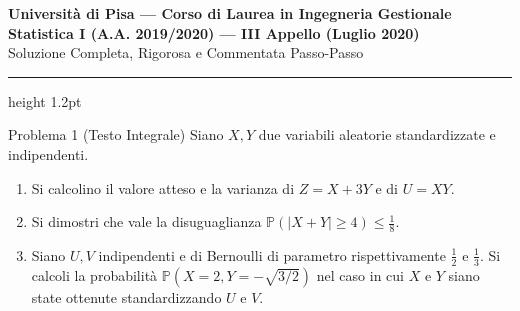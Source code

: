 \documentclass[11pt,a4paper]{article}
\newcommand{\Prob}{\mathbb{P}}
\begin{document}
\begin{center}
    {\LARGE\bfseries\color{navyblue} Università di Pisa --- Corso di Laurea in Ingegneria Gestionale}\\[0.4em]
    {\Large\bfseries Statistica I (A.A. 2019/2020) --- III Appello (Luglio 2020)}\\[0.3em]
    {\large\textsf{Soluzione Completa, Rigorosa e Commentata Passo-Passo}}
\end{center}
\vspace{0.5em}
\hrule height 1.2pt
\vspace{1.5em}

\begin{problemabox}{Problema 1 (Testo Integrale)}
Siano $X,Y$ due variabili aleatorie standardizzate e indipendenti.
\begin{enumerate}[label=(\roman*)]
    \item Si calcolino il valore atteso e la varianza di $Z=X+3Y$ e di $U=XY$.
    \item Si dimostri che vale la disuguaglianza $\Prob(|X+Y| \ge 4) \le \frac{1}{8}$.
    \item Siano $U,V$ indipendenti e di Bernoulli di parametro rispettivamente $\frac{1}{2}$ e $\frac{1}{3}$. Si calcoli la probabilità $\Prob(X=2, Y=-\sqrt{3/2})$ nel caso in cui $X$ e $Y$ siano state ottenute standardizzando $U$ e $V$.
\end{enumerate}
\end{problemabox}
\end{document}
